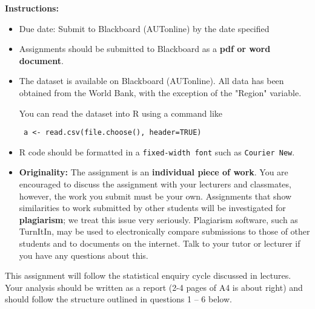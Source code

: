 \documentclass[11pt]{exam}
\begin{document}
  \textbf{{ Instructions:}} %
   \begin{itemize}
    \item Due date:  Submit to Blackboard (AUTonline) by the date specified

\item Assignments should be submitted to Blackboard as a \textbf{pdf
  or word document}.

\item The dataset is available on Blackboard (AUTonline).  All data
  has been obtained from the World Bank, with the exception of the
  "Region" variable.

  You can read the dataset into R using a command like

  \verb+ a <- read.csv(file.choose(), header=TRUE)+

  
\item R code should be formatted in a \texttt{fixed-width font} such
  as \texttt{Courier New}.

\item \textbf{Originality:} The assignment is an \textbf{individual
  piece of work}. You are encouraged to discuss the assignment with
  your lecturers and classmates, however, the work you submit must be
  your own.  Assignments that show similarities to work submitted by
  other students will be investigated for \textbf{plagiarism}; we
  treat this issue very seriously.  Plagiarism software, such as
  TurnItIn, may be used to electronically compare submissions to those
  of other students and to documents on the internet.  Talk to your
  tutor or lecturer if you have any questions about this.


 \end{itemize}


\vfill

 \begin{center}
    \gradetable[h][questions]   %
 \end{center}
\vfill


\newpage
\noindent
This assignment will follow the statistical enquiry cycle discussed in
lectures.  Your analysis should be written as a report (2-4 pages of
A4 is about right) and should follow the structure outlined in
questions 1 -- 6 below.
\end{document}
